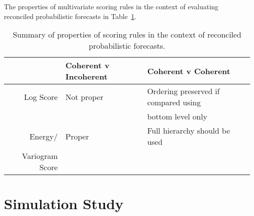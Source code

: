 \documentclass[a4paper, 11pt]{article}
\def\E{\text{E}}
\theoremstyle{theo}
\theoremstyle{definition}
\begin{document}
The properties of multivariate scoring rules in the context of evaluating reconciled probabilistic forecasts in Table~\ref{tab:prop}.

\begin{table}
	\centering
	\begin{tabular}{rll}
	& Coherent v Incoherent &Coherent v Coherent\\
	\hline
	Log Score & Not proper & Ordering preserved if compared using\\ &&bottom level only\\
	Energy/ & Proper & Full hierarchy should be used\\
	Variogram Score & &\\
	\hline
    \end{tabular}
	\caption{Summary of properties of scoring rules in the context of reconciled probabilistic forecasts.}
	\label{tab:prop}

\end{table}

%
%

\section{Simulation Study}\label{sec:gaussian}
\end{document}
